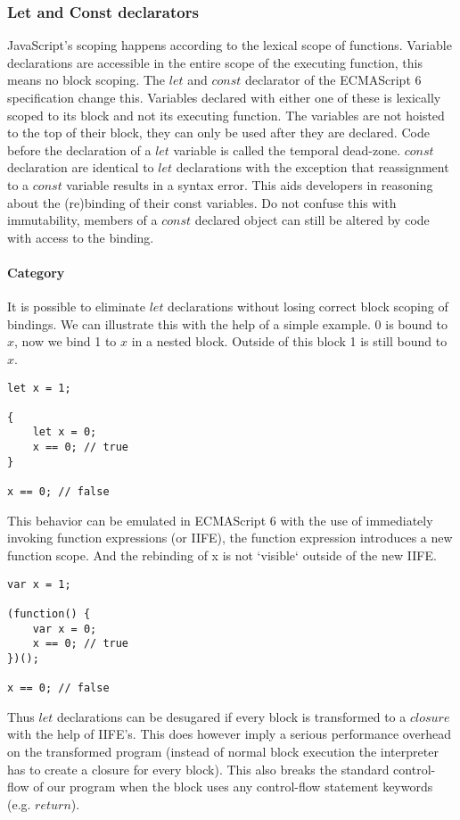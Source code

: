 \subsubsection{Let and Const declarators} \label{let-const}
JavaScript's scoping happens according to the lexical scope of functions. Variable declarations are accessible in the entire scope of the executing function, this means no block scoping. The $let$ and $const$ declarator of the ECMAScript 6 specification change this. Variables declared with either one of these is lexically scoped to its block and not its executing function. The variables are not hoisted to the top of their block, they can only be used after they are declared. Code before the declaration of a $let$ variable is called the temporal dead-zone. $const$ declaration are identical to $let$ declarations with the exception that reassignment to a $const$ variable results in a syntax error. This aids developers in reasoning about the (re)binding of their const variables. Do not confuse this with immutability, members of a $const$ declared object can still be altered by code with access to the binding.

\paragraph{Category}
It is possible to eliminate $let$ declarations without losing correct block scoping of bindings. We can illustrate this with the help of a simple example. 0 is bound to $x$, now we bind 1 to $x$ in a nested block. Outside of this block 1 is still bound to $x$.

\begin{lstlisting}
let x = 1;

{
	let x = 0;
	x == 0; // true
}

x == 0; // false
\end{lstlisting}

This behavior can be emulated in ECMAScript 6 with the use of immediately invoking function expressions (or IIFE), the function expression introduces a new function scope. And the rebinding of x is not `visible` outside of the new IIFE.

\begin{lstlisting}
var x = 1;

(function() {
	var x = 0;
	x == 0; // true
})();

x == 0; // false
\end{lstlisting}

Thus $let$ declarations can be desugared if every block is transformed to a $closure$ with the help of IIFE's. This does however imply a serious performance overhead on the transformed program (instead of normal block execution the interpreter has to create a closure for every block). This also breaks the standard control-flow of our program when the block uses any control-flow statement keywords (e.g. $return$). 

